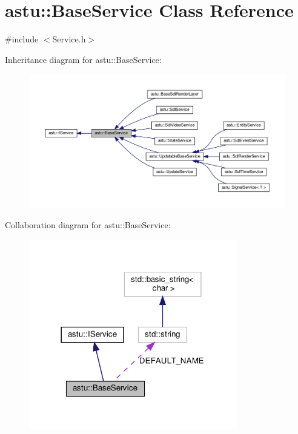 \hypertarget{classastu_1_1BaseService}{}\section{astu\+:\+:Base\+Service Class Reference}
\label{classastu_1_1BaseService}


{\ttfamily \#include $<$Service.\+h$>$}



Inheritance diagram for astu\+:\+:Base\+Service\+:\nopagebreak
\begin{figure}[H]
\begin{center}
\leavevmode
\includegraphics[width=350pt]{classastu_1_1BaseService__inherit__graph}
\end{center}
\end{figure}


Collaboration diagram for astu\+:\+:Base\+Service\+:\nopagebreak
\begin{figure}[H]
\begin{center}
\leavevmode
\includegraphics[width=258pt]{classastu_1_1BaseService__coll__graph}
\end{center}
\end{figure}
